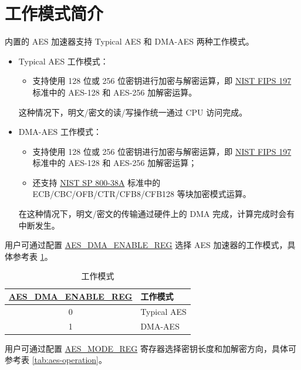 \documentclass[main\_\_CN.tex]{subfiles}
\begin{document}
\section{工作模式简介}

\chipname{} 内置的 AES 加速器支持 Typical AES 和 DMA-AES 两种工作模式。

\begin{itemize}
    \item Typical AES 工作模式：
    \begin{itemize}
        \item 支持使用 128 位或 256 位密钥进行加密与解密运算，即 \href{https://nvlpubs.nist.gov/nistpubs/FIPS/NIST.FIPS.197.pdf}{NIST FIPS 197} 标准中的 AES-128 和 AES-256  加解密运算。
    \end{itemize}
    这种情况下，明文/密文的读/写操作统一通过 CPU 访问完成。
    \item DMA-AES 工作模式：
    \begin{itemize}
        \item 支持使用 128 位或 256 位密钥进行加密与解密运算，即 \href{https://nvlpubs.nist.gov/nistpubs/FIPS/NIST.FIPS.197.pdf}{NIST FIPS 197} 标准中的 AES-128 和 AES-256 加解密运算；
        \item 还支持 \href{https://nvlpubs.nist.gov/nistpubs/Legacy/SP/nistspecialpublication800-38a.pdf}{NIST SP 800-38A} 标准中的 ECB/CBC/OFB/CTR/CFB8/CFB128 等块加密模式运算。
    \end{itemize}
    在这种情况下，明文/密文的传输通过硬件上的 DMA 完成，计算完成时会有中断发生。
\end{itemize}

用户可通过配置 \hyperref[regdesc:AESDMAENABLEREG]{AES\_DMA\_ENABLE\_REG} 选择 AES 加速器的工作模式，具体参考表 \ref{tab:aes-dma-enable}。

\begin{longtable}[c]{ |c|l| }
\caption{工作模式}
\label{tab:aes-dma-enable}
\\\hline
\rowcolor{lightgray}
\hyperref[regdesc:AESDMAENABLEREG]{AES\_DMA\_ENABLE\_REG}       & 工作模式\\
    \hline
    0           & Typical AES    \\
    \hline
    1           & DMA-AES        \\
    \hline
\end{longtable}

用户可通过配置 \hyperref[regdesc:AESMODEREG]{AES\_MODE\_REG} 寄存器选择密钥长度和加解密方向，具体可参考表 \ref{tab:aes-operation}。
\end{document}
